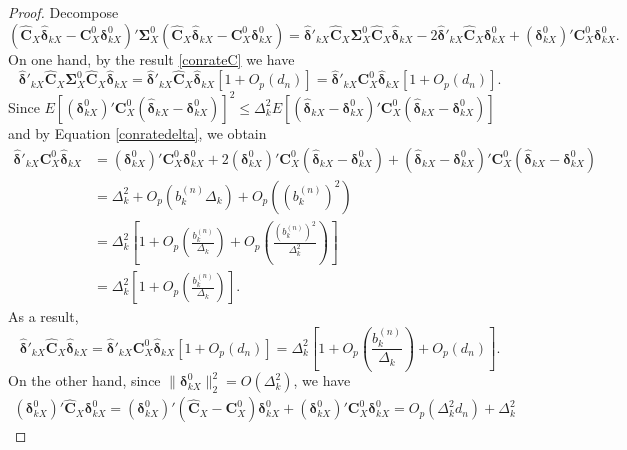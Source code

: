 \documentclass[12pt]{article}
\begin{document}
\begin{proof}{}{}
Decompose
\begin{equation}\label{eq:4}
(\hat{\bm C}_X \hat{\bm \delta}_{kX} - \bm C_X^0 \bm \delta_{kX}^0)'
\bm \Sigma_X^0 (\hat{\bm C}_X \hat{\bm \delta}_{kX} - \bm C_X^0 \bm \delta_{kX}^0) = \hat{\bm \delta}'_{kX} \hat{\bm C}_X \bm \Sigma_X^0 \hat{\bm C}_X \hat{\bm \delta}_{kX} - 2 \hat{\bm \delta}'_{kX} \hat{\bm C}_X \bm \delta_{kX}^0 + (\bm \delta_{kX}^0)' \bm C_X^0 \bm \delta_{kX}^0.
\end{equation}
On one hand, by the result \eqref{conrateC} we have
\begin{equation*}
\hat{\bm \delta}'_{kX} \hat{\bm C}_X \bm \Sigma_X^0 \hat{\bm C}_X \hat{\bm \delta}_{kX} = \hat{\bm \delta}'_{kX} \hat{\bm C}_X \hat{\bm \delta}_{kX} [1 + O_p(d_n)] = \hat{\bm \delta}'_{kX} \bm C_X^0 \hat{\bm \delta}_{kX} [1 + O_p(d_n)].
\end{equation*}
Since $E[ (\bm \delta^0_{kX})' \bm C_X^0 (\hat{\bm \delta}_{kX} - \bm \delta^0_{kX})]^2 \leq \Delta_k^2 E[(\hat{\bm \delta}_{kX} - \bm \delta^0_{kX})' \bm C_X^0 (\hat{\bm \delta}_{kX} - \bm \delta_{kX}^0)]$ and by Equation \eqref{conratedelta}, we obtain
\begin{align*}
\hat{\bm \delta}'_{kX} \bm C_X^0 \hat{\bm \delta}_{kX} &= (\bm \delta_{kX}^0)' \bm C_X^0 \bm \delta_{kX}^0 + 2 (\bm \delta_{kX}^0)' \bm C_X^0 (\hat{\bm \delta}_{kX} - \bm \delta_{kX}^0) + (\hat{\bm \delta}_{kX} - \bm \delta_{kX}^0)' \bm C_X^0 (\hat{\bm \delta}_{kX} - \bm \delta_{kX}^0) \\
&= \Delta_k^2 + O_p(b_k^{(n)} \Delta_k) + O_p((b_k^{(n)})^2) \\
&= \Delta_k^2 [1 + O_p(\frac{b_k^{(n)}}{\Delta_k}) + O_p(\frac{(b_k^{(n)})^2}{\Delta_k^2})] \\
&= \Delta_k^2 [1 + O_p(\frac{b_k^{(n)}}{\Delta_k})].
\end{align*}
As a result,
\begin{equation}\label{eq:5}
\hat{\bm \delta}'_{kX} \hat{\bm C}_X \hat{\bm \delta}_{kX}
= \hat{\bm \delta}'_{kX} \bm C_X^0 \hat{\bm \delta}_{kX} [1 + O_p(d_n)]
= \Delta_k^2 [1 + O_p(\frac{b_k^{(n)}}{\Delta_k}) + O_p(d_n)].
\end{equation}
On the other hand, since $\| \bm \delta_{kX}^0 \|_2^2 = O(\Delta_k^2)$, we have
\begin{align}\label{eq:insert1}
(\bm \delta_{kX}^0)' \hat{\bm C}_X \bm \delta_{kX}^0 = (\bm \delta_{kX}^0)' (\hat{\bm C}_X - \bm C_X^0) \bm \delta_{kX}^0 + (\bm \delta_{kX}^0)' \bm C_X^0 \bm \delta_{kX}^0
= O_p(\Delta_k^2 d_n) + \Delta_k^2

\end{align}
\end{proof}
\end{document}
